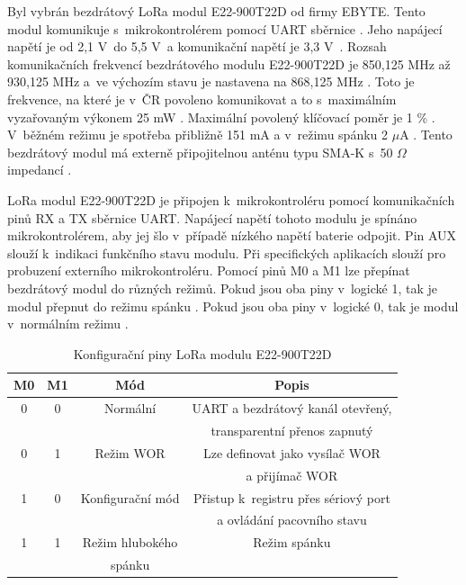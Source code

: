 Byl vybrán bezdrátový LoRa modul E22-900T22D od firmy EBYTE. Tento modul komunikuje s~mikrokontrolérem pomocí UART sběrnice \cite{LoRa_ebyte}. Jeho napájecí napětí je od 
2,1 V~do 5,5 V~a komunikační napětí je 3,3 V~\cite{LoRa_ebyte}. Rozsah komunikačních frekvencí bezdrátového modulu E22-900T22D je 850,125 MHz až 930,125 MHz a~ve výchozím 
stavu je nastavena na 868,125 MHz \cite{LoRa_ebyte}. Toto je frekvence, na které je v~ČR povoleno komunikovat a to s~maximálním vyzařovaným výkonem 25 mW \cite{CTU}. 
Maximální povolený klíčovací poměr je 1 \% \cite{CTU}. %
V~běžném režimu je spotřeba přibližně 151 mA a v~režimu spánku 2 $\mu$A \cite{LoRa_ebyte}. Tento bezdrátový modul má externě připojitelnou anténu typu SMA-K s~50 $\Omega$ 
impedancí \cite{LoRa_ebyte}.

LoRa modul E22-900T22D je připojen k~mikrokontroléru pomocí komunikačních pinů RX a TX sběrnice UART. Napájecí napětí tohoto modulu je spínáno mikrokontrolérem, aby jej 
šlo v~případě nízkého napětí baterie odpojit. Pin AUX slouží k~indikaci funkčního stavu modulu. Při specifických aplikacích slouží pro probuzení externího mikrokontroléru. 
Pomocí pinů M0 a M1 lze přepínat bezdrátový modul do různých režimů. Pokud jsou oba piny v~logické 1, 
tak je modul přepnut do režimu spánku \cite{LoRa_ebyte}. Pokud jsou oba piny v~logické 0, tak je modul v~normálním režimu \cite{LoRa_ebyte}. 

\begin{table}[!h]
  \caption[Konfigurační piny LoRa modulu E22-900T22D]{Konfigurační piny LoRa modulu E22-900T22D \cite{LoRa_ebyte}}
  \begin{center}
  	\small
	  \begin{tabular}{|c|c|c|c|}
	    \hline
	    \textbf{M0}	& \textbf{M1}	& \textbf{Mód} & \textbf{Popis} \\
	    \hline
	    0	& 0 & Normální & UART a bezdrátový kanál otevřený, \\ 
      & & &transparentní přenos zapnutý \\ 
	    \hline
	    0	& 1 & Režim WOR & Lze definovat jako vysílač WOR \\
      & & & a přijímač WOR \\ 
	    \hline
	    1 & 0 & Konfigurační mód & Přistup k~registru přes sériový port \\
      & & & a ovládání pacovního stavu \\
	    \hline
      1 & 1 & Režim hlubokého & Režim spánku \\
      & & spánku & \\
	    \hline
	  \end{tabular}
  \end{center}
\end{table}

